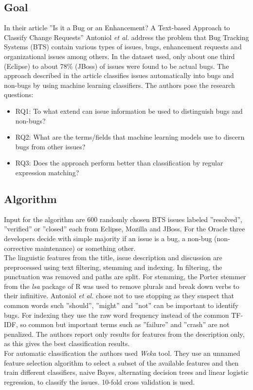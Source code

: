 \subsection{Goal}
In their article ''Is it a Bug or an Enhancement? A Text-based Approach to Classify Change Requests'' Antoniol \textit{et al.} address the problem that Bug Tracking Systems (BTS) contain various types of issues, bugs, enhancement requests and organizational issues among others. In the dataset used, only about one third (Eclipse) to about 78\% (JBoss) of issues were found to be actual bugs. The approach described in the article classifies issues automatically into bugs and non-bugs by using machine learning classifiers. The authors pose the research questions: \begin{itemize}
\item RQ1: To what extend can issue information be used to distinguish bugs and non-bugs?
\item RQ2:  What are the terms/fields that machine learning models use to discern bugs from other issues?
\item RQ3: Does the approach perform better than classification by regular expression matching?
\end{itemize}

\subsection{Algorithm}
Input for the algorithm are 600 randomly chosen BTS issues labeled ''resolved'', ''verified'' or ''closed'' each from Eclipse, Mozilla and JBoss. For the Oracle three developers decide with simple majority if an issue is a bug, a non-bug (non-corrective maintenance) or something other.\\
The linguistic features from the title, issue description and discussion are preprocessed using text filtering, stemming and indexing. In filtering, the punctuation was removed and paths are split. For stemming, the Porter stemmer from the \textit{lsa} package of R was used to remove plurals and break down verbs to their infinitive. Antoniol \textit{et al.} chose not to use stopping as they suspect that common words such ''should'', ''might'' and ''not'' can be important to identify bugs. For indexing they use the raw word frequency instead of the common TF-IDF, so common but important terms such as ''failure'' and ''crash'' are not penalized. The authors report only results for features from the description only, as this gives the best classification results.\\
For automatic classification the authors used \textit{Weka} tool.
They use an unnamed feature selection algorithm to select a subset of the available features and then train different classifiers, naive Bayes, alternating decision trees and linear logistic regression, to classify the issues. 10-fold cross validation is used.

